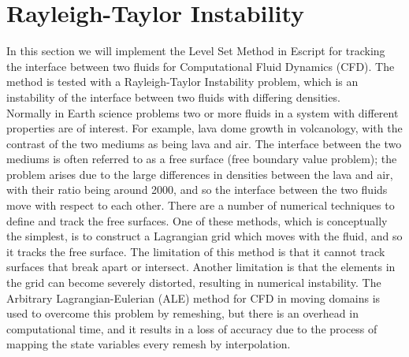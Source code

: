 
%
%
%


\section{Rayleigh-Taylor Instability}
\label{LEVELSET CHAP}

In this section we will implement the Level Set Method in Escript for tracking the interface between two fluids for Computational Fluid Dynamics (CFD). The method is tested with a Rayleigh-Taylor Instability problem, which is an instability of the interface between two fluids with differing densities. \\ 
Normally in Earth science problems two or more fluids in a system with different properties are of interest. For example, lava dome growth in volcanology, with the contrast of the two mediums as being lava and air. The interface between the two mediums is often referred to as a free surface (free boundary value problem); the problem arises due to the large differences in densities between the lava and air, with their ratio being around 2000, and so the interface between the two fluids move with respect to each other.  
There are a number of numerical techniques to define and track the free surfaces. One of these methods, which is conceptually the simplest, is to construct a Lagrangian grid which moves with the fluid, and so it tracks the free surface. The limitation of this method is that it cannot track surfaces that break apart or intersect. Another limitation is that the elements in the grid can become severely distorted, resulting in numerical instability. The Arbitrary Lagrangian-Eulerian (ALE) method for CFD in moving domains is used to overcome this problem by remeshing, but there is an overhead in computational time, and it results in a loss of accuracy due to the process of mapping the state variables every remesh by interpolation.

